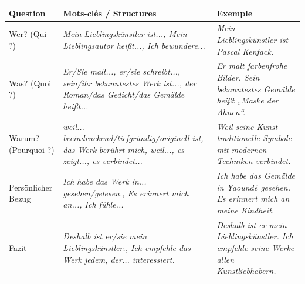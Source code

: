 \documentclass[11pt]{article}
\newcommand{\all}[1]{\ifmmode\text{\textit{#1}}\else\begingroup\selectlanguage{ngerman}\itshape #1\endgroup\fi}
\begin{document}
\begin{exemplebox}
\begin{center}
\begin{tabularx}{\linewidth}{|X|X|X|}\hline
\rowcolor{popblueL} \textbf{Question} & \textbf{Mots-clés / Structures} & \textbf{Exemple} \\ \hline
Wer? (Qui ?) & \all{Mein Lieblingskünstler ist...}, \all{Mein Lieblingsautor heißt...}, \all{Ich bewundere...} & \all{Mein Lieblingskünstler ist Pascal Kenfack.} \\ \hline
Was? (Quoi ?) & \all{Er/Sie malt...}, \all{er/sie schreibt...}, \all{sein/ihr bekanntestes Werk ist...}, \all{der Roman/das Gedicht/das Gemälde heißt...} & \all{Er malt farbenfrohe Bilder. Sein bekanntestes Gemälde heißt „Maske der Ahnen“.} \\ \hline
Warum? (Pourquoi ?) & \all{weil... beeindruckend/tiefgründig/originell ist}, \all{das Werk berührt mich, weil...}, \all{es zeigt...}, \all{es verbindet...} & \all{Weil seine Kunst traditionelle Symbole mit modernen Techniken verbindet.} \\ \hline
Persönlicher Bezug & \all{Ich habe das Werk in... gesehen/gelesen.}, \all{Es erinnert mich an...}, \all{Ich fühle...} & \all{Ich habe das Gemälde in Yaoundé gesehen. Es erinnert mich an meine Kindheit.} \\ \hline
Fazit & \all{Deshalb ist er/sie mein Lieblingskünstler.}, \all{Ich empfehle das Werk jedem, der... interessiert.} & \all{Deshalb ist er mein Lieblingskünstler. Ich empfehle seine Werke allen Kunstliebhabern.} \\ \hline
\end{tabularx}
\end{center}
\end{exemplebox}
\end{document}

